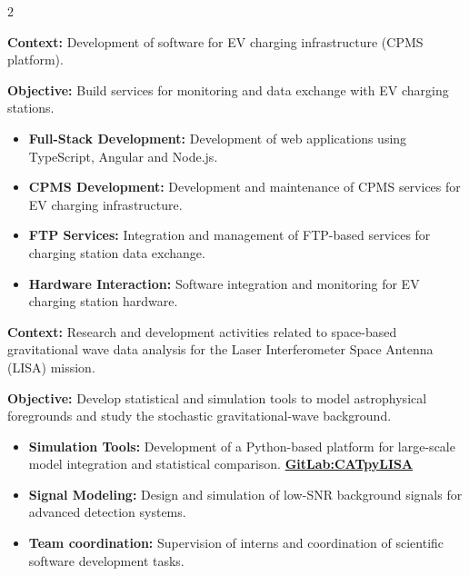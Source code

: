 \documentclass[8pt,a4paper,ragged2e,withhyper]{../_shared/altacv}
\begin{document}
\begin{paracol}{2}

\textbf{Context:} Development of software for EV charging infrastructure (CPMS platform).

\textbf{Objective:} Build services for monitoring and data exchange with EV charging stations.

\begin{itemize}
\item \textbf{Full-Stack Development:} Development of web applications using TypeScript, Angular and Node.js.
\item \textbf{CPMS Development:} Development and maintenance of CPMS services for EV charging infrastructure.
\item \textbf{FTP Services:} Integration and management of FTP-based services for charging station data exchange.
\item \textbf{Hardware Interaction:} Software integration and monitoring for EV charging station hardware.
\end{itemize}
\divider
{}

\textbf{Context:} Research and development activities related to space-based gravitational wave data analysis for the Laser Interferometer Space Antenna (LISA) mission.

\textbf{Objective:} Develop statistical and simulation tools to model astrophysical foregrounds and study the stochastic gravitational-wave background.

\begin{itemize}
\item \textbf{Simulation Tools:} Development of a Python-based platform for large-scale model integration and statistical comparison. \textcolor{DarkPastelRed}{\href{https://gitlab.oca.eu/gboileau/lisa_l3_tools}{\bf GitLab:CATpyLISA}}

\item \textbf{Signal Modeling:} Design and simulation of low-SNR background signals for advanced detection systems.

\item \textbf{Team coordination:} Supervision of interns and coordination of scientific software development tasks.


\end{itemize}
\end{paracol}
\end{document}
